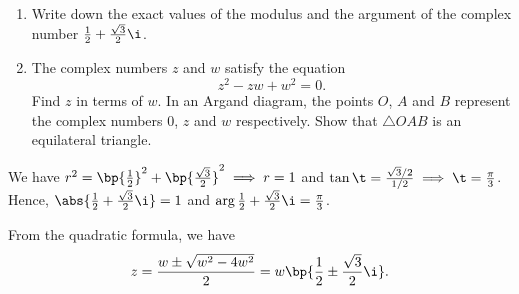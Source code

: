 \begin{problem}
    \begin{enumerate}
        \item Write down the exact values of the modulus and the argument of the complex number $\frac12 + \frac{\sqrt3}2 \i$.
        \item The complex numbers $z$ and $w$ satisfy the equation \[z^2 - zw + w^2 = 0.\] Find $z$ in terms of $w$. In an Argand diagram, the points $O$, $A$ and $B$ represent the complex numbers $0$, $z$ and $w$ respectively. Show that $\triangle OAB$ is an equilateral triangle.
    \end{enumerate}
\end{problem}
\begin{solution}
    \begin{ppart}
        We have $r^2 = \bp{\frac12}^2 + \bp{\frac{\sqrt3}2}^2 \implies r = 1$ and $\tan \t = \frac{\sqrt3 /2}{1/2} \implies \t = \frac\pi3$. Hence, $\abs{\frac12 + \frac{\sqrt3}2 \i} = 1$ and $\arg{\frac12 + \frac{\sqrt3}2 \i} = \frac\pi3$.
    \end{ppart}
    \begin{ppart}
        From the quadratic formula, we have \[z = \frac{w \pm \sqrt{w^2 - 4w^2}}{2} = w \bp{\frac12 \pm \frac{\sqrt3}2 \i}.\]

            \begin{center}
\end{center}
\end{ppart}
\end{solution}
